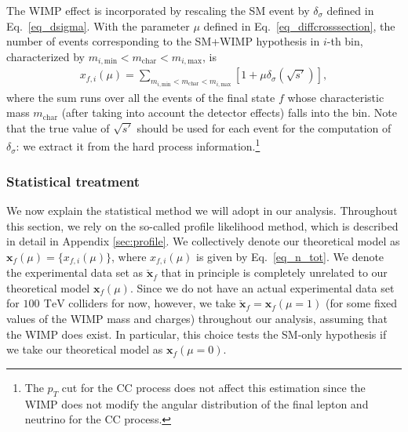 \documentclass[12pt,twoside,book]{article}
\begin{document}
The WIMP effect is incorporated by rescaling the SM event by $\delta_\sigma$ defined in Eq.~\eqref{eq_dsigma}.
With the parameter $\mu$ defined in Eq.~\eqref{eq_diffcrosssection}, the number of events corresponding to the SM+WIMP hypothesis in $i$-th bin, characterized by $m_{i, \mathrm{min}} < m_{\mathrm{char}} < m_{i, \mathrm{max}}$, is
\begin{align}
  x_{f,i} (\mu) = \sum_{m_{i, \mathrm{min}} < m_{\mathrm{char}} < m_{i, \mathrm{max}}}
  \left[
    1 + \mu \delta_\sigma (\sqrt{s'})
  \right],
  \label{eq_n_tot}
\end{align}
where the sum runs over all the events of the final state $f$ whose characteristic mass $m_{\mathrm{char}}$ (after taking into account the detector effects) falls into the bin.
Note that the true value of $\sqrt{s'}$ should be used for each event for the computation of $\delta_\sigma$: we extract it from the hard process information.\footnote
{
	The $p_T$ cut for the CC process does not affect this estimation since the WIMP does not modify the angular distribution of the final lepton and neutrino for the CC process.
}


\subsubsection{Statistical treatment}
\label{sec_statistical}

We now explain the statistical method we will adopt in our analysis.
Throughout this section, we rely on the so-called profile likelihood method, which is described in detail in Appendix \ref{sec:profile}.
We collectively denote our theoretical model as $\bm{x}_f(\mu) = \{ x_{f,i} (\mu) \}$, where $x_{f,i}(\mu)$ is given by Eq.~\eqref{eq_n_tot}.
We denote the experimental data set as $\check{\bm{x}}_f$ that in principle is completely unrelated to our theoretical model $\bm{x}_f(\mu)$.
Since we do not have an actual experimental data set for $100~\,\mathrm{TeV}$ colliders for now, however, we take $\check{\bm{x}}_f = \bm{x}_f(\mu = 1)$ (for some fixed values of the WIMP mass and charges) throughout our analysis, assuming that the WIMP does exist.  In particular, this choice tests the SM-only hypothesis if we take our theoretical model as $\bm{x}_f(\mu=0)$.
\end{document}
